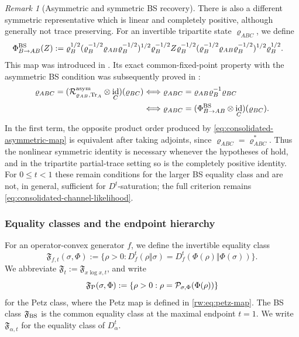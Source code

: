 \documentclass[11pt]{article}
\theoremstyle{remark}
\newtheorem{remark}[remark]{Remark}
\DeclareMathOperator{\id}{id}
\newcommand{\1}{\mathbbm{1}}
\begin{document}
\begin{remark}[Asymmetric and symmetric BS recovery]
There is also a different symmetric representative which is linear
and completely positive, although generally not trace preserving.
For an invertible tripartite state $\varrho_{ABC}$, we define
\begin{align}
 \Phi_{B\to AB}^{\rm BS}(Z)
 :={}&\varrho_B^{1/2}
 (\varrho_B^{-1/2}\varrho_{AB}\varrho_B^{-1/2})^{1/2}
 \varrho_B^{-1/2}Z\varrho_B^{-1/2}
 (\varrho_B^{-1/2}\varrho_{AB}\varrho_B^{-1/2})^{1/2}
 \varrho_B^{1/2}.
 \label{eq:consolidated-BS-CP-map}
\end{align}
This map was introduced in
\cite[(54)]{alhambra2026conditional}.  Its exact common-fixed-point
property with the asymmetric BS condition was subsequently proved in
\cite[(13) and Corollary~3.9]{Bluhm:2025kai}:
\begin{equation}
 \begin{aligned}
  \varrho_{ABC}
  =(\mathcal R_{\varrho_{AB},\operatorname{Tr}_A}^{\rm asym}
    \otimes\id_C)(\varrho_{BC})
  &\Longleftrightarrow
  \varrho_{ABC}=\varrho_{AB}\varrho_B^{-1}\varrho_{BC}\\
  &\Longleftrightarrow
  \varrho_{ABC}
  =(\Phi_{B\to AB}^{\rm BS}\otimes\id_C)(\varrho_{BC}).
 \end{aligned}
 \label{eq:consolidated-tripartite-symmetric-BS-equivalence}
\end{equation}
In the first term, the opposite product order produced by
\eqref{eq:consolidated-asymmetric-map} is equivalent after taking
adjoints, since $\varrho_{ABC}=\varrho_{ABC}^*$.  Thus the nonlinear
symmetric identity is necessary whenever the hypotheses of
 hold, and in the
tripartite partial-trace setting so is the completely positive
identity.  For $0\leq t<1$ these remain conditions for the larger BS
equality class and are not, in general, sufficient for
$D^t$-saturation; the full criterion remains
\eqref{eq:consolidated-channel-likelihood}.
\end{remark}

\subsubsection{Equality classes and the endpoint hierarchy}

For an operator-convex generator $f$, we define the invertible equality
class
\begin{equation}
 \mathfrak F_{f,t}(\sigma,\Phi)
 :=\{\rho>0:
 D_f^t(\rho\Vert\sigma)
 =D_f^t(\Phi(\rho)\Vert\Phi(\sigma))\}.
 \label{eq:consolidated-Fft}
\end{equation}
We abbreviate
$\mathfrak F_t:=\mathfrak F_{x\log x,t}$, and write
\begin{equation}
 \mathfrak F_{\rm P}(\sigma,\Phi)
 :=\{\rho>0:\rho=\mathcal P_{\sigma,\Phi}(\Phi(\rho))\}
\end{equation}
for the Petz class, where the Petz map is defined in
\eqref{rw:eq:petz-map}.  The BS class $\mathfrak F_{\rm BS}$ is the
common equality class at the maximal endpoint $t=1$.  We write
$\mathfrak F_{\alpha,t}$ for the equality class of
$D_\alpha^t$.
\end{document}
